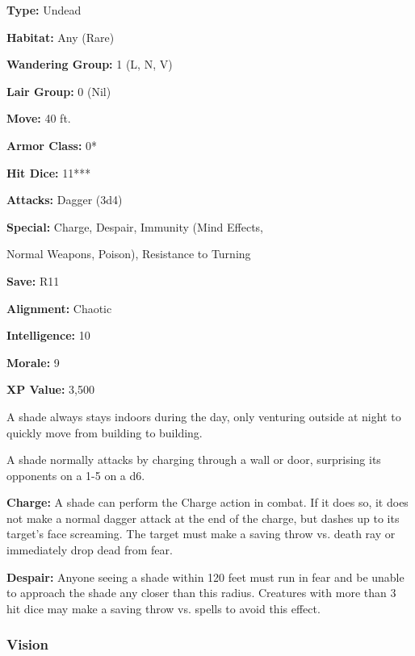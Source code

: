 \begin{multicols*}{2}
{\textbf{Type:} Undead

\textbf{Habitat:} Any (Rare)

\textbf{Wandering Group:} 1 (L, N, V)

\textbf{Lair Group:} 0 (Nil)

\textbf{Move:} 40 ft.

\textbf{Armor Class:} 0*

\textbf{Hit Dice:} 11***

\textbf{Attacks:} Dagger (3d4)

\textbf{Special:} Charge, Despair, Immunity (Mind Effects, 

Normal Weapons, Poison), Resistance to Turning

\textbf{Save:} R11

\textbf{Alignment:} Chaotic

\textbf{Intelligence:} 10

\textbf{Morale:} 9

\textbf{XP Value:} 3,500}

A shade always stays indoors during the day, only venturing outside at night to quickly move from building to building.

A shade normally attacks by charging through a wall or door, surprising its opponents on a 1-5 on a d6.

\textbf{Charge:} A shade can perform the Charge action in combat. If it does so, it does not make a normal dagger attack at the end of the charge, but dashes up to its target’s face screaming. The target must make a saving throw vs. death ray or immediately drop dead from fear.

\textbf{Despair:} Anyone seeing a shade within 120 feet must run in fear and be unable to approach the shade any closer than this radius. Creatures with more than 3 hit dice may make a saving throw vs. spells to avoid this effect.

\subsubsection{Vision}
\end{multicols*}
